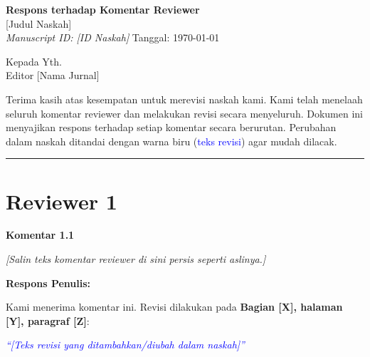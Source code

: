 \documentclass[12pt,a4paper]{article}
\begin{document}
\begin{center}
  {\Large\bfseries Respons terhadap Komentar Reviewer}\\[0.5em]
  {\large [Judul Naskah]}\\[0.3em]
  \textit{Manuscript ID: [ID Naskah]} \quad Tanggal: \today
\end{center}

\bigskip

Kepada Yth.\\
Editor [Nama Jurnal]

\medskip

Terima kasih atas kesempatan untuk merevisi naskah kami. Kami telah menelaah seluruh komentar
reviewer dan melakukan revisi secara menyeluruh. Dokumen ini menyajikan respons terhadap
setiap komentar secara berurutan. Perubahan dalam naskah ditandai dengan warna biru
(\textcolor{blue}{teks revisi}) agar mudah dilacak.

\bigskip
\hrule
\bigskip

\section*{Reviewer 1}

\noindent\textbf{Komentar 1.1}
\begin{mdframed}[style=reviewerbox]
  \textit{[Salin teks komentar reviewer di sini persis seperti aslinya.]}
\end{mdframed}

\noindent\textbf{Respons Penulis:}
\begin{mdframed}[style=authorbox]

  Kami menerima komentar ini. Revisi dilakukan pada \textbf{Bagian [X], halaman [Y], paragraf [Z]}:

  \medskip
  \textcolor{blue}{\textit{``[Teks revisi yang ditambahkan/diubah dalam naskah]''}}

\end{mdframed}
\end{document}
